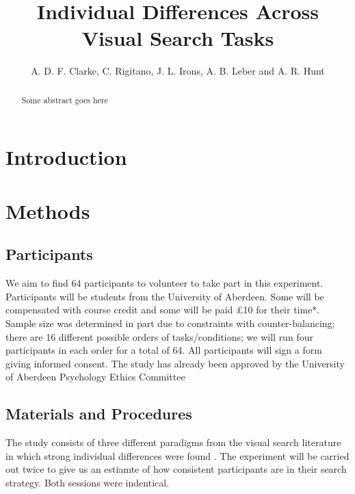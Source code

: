 \documentclass[a4paper, oneside, 11pt, onecolumn]{article}
\begin{document}
\title{Individual Differences Across Visual Search Tasks}

\author{A. D. F. Clarke, C. Rigitano, J. L. Irons, A. B. Leber and A. R. Hunt}

\maketitle

\begin{abstract}
Some abstract goes here
\end{abstract}

\section{Introduction}


\section{Methods}


\subsection{Participants}
We aim to find 64 participants to volunteer to take part in this experiment. Participants will be students from the University of Aberdeen. Some will be compensated with course credit and some will be paid £10 for their time*. Sample size was determined in part due to constraints with counter-balancing; there are 16 different possible orders of tasks/conditions; we will run four participants in each order for a total of 64. All participants will sign a form giving informed consent. The study has already been approved by the University of Aberdeen Psychology Ethics Committee 

\subsection{Materials and Procedures}

The study consists of three different paradigms from the visual search literature in which strong individual differences were found \citep{nowakowsak2017, irons-leber2016, kristjansson2014}. The \cite{nowakowsak2017} experiment will be carried out twice to give us an estiamte of how consistent participants are in their search strategy. Both sessions were indentical.
\end{document}

